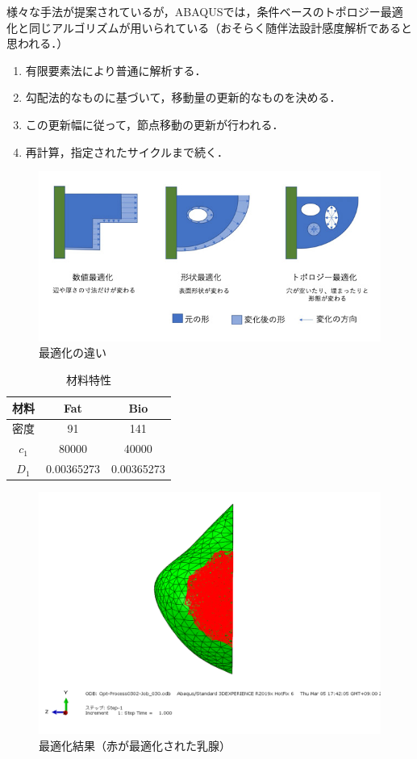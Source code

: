 \documentclass[11pt]{jsarticle}
\begin{document}
				様々な手法が提案されているが，ABAQUSでは，条件ベースのトポロジー最適化と同じアルゴリズムが用いられている（おそらく随伴法設計感度解析であると思われる．）
				\begin{enumerate}
					\item 有限要素法により普通に解析する．
					\item 勾配法的なものに基づいて，移動量の更新的なものを決める．
					\item この更新幅に従って，節点移動の更新が行われる．
					\item 再計算，指定されたサイクルまで続く．
				\end{enumerate}
			\begin{figure}[!h]
				\centering
					\includegraphics[width=0.8\columnwidth]{Figure/img_opt.jpg}
				\caption{最適化の違い}
				\label{fig:ExampleOfBra_str}
			\end{figure}
		\begin{table}
			\caption{材料特性}
			\label{tab:Material}
			\centering
			\begin{tabular}{|c|c|c|} \hline
				材料&Fat&Bio \\ \hline
				密度&91&141\\ \hline
				$ c_1 $&80000&40000\\ \hline
				$D_1$&0.00365273&0.00365273 \\ \hline
			\end{tabular}
		\end{table}
		\begin{figure}[!h]
			\centering
			\includegraphics[width=0.8\columnwidth]{Figure/test.png}
			\caption{最適化結果（赤が最適化された乳腺）}
			\label{fig:ResultYZview}
		\end{figure}
		
\end{document}
